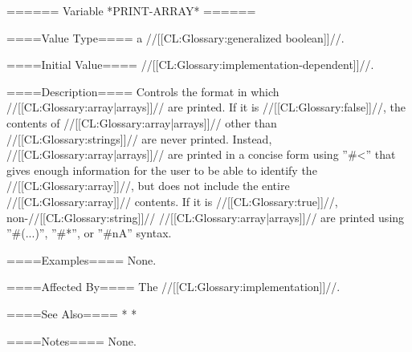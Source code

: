 ====== Variable *PRINT-ARRAY* ======

====Value Type====
a //[[CL:Glossary:generalized boolean]]//.

====Initial Value====
//[[CL:Glossary:implementation-dependent]]//.

====Description====
Controls the format in which //[[CL:Glossary:array|arrays]]// are printed. If it is //[[CL:Glossary:false]]//, the contents of //[[CL:Glossary:array|arrays]]// other than //[[CL:Glossary:strings]]// are never printed. Instead, //[[CL:Glossary:array|arrays]]// are printed in a concise form using ''#<'' that gives enough information for the user to be able to identify the //[[CL:Glossary:array]]//, but does not include the entire //[[CL:Glossary:array]]// contents. If it is //[[CL:Glossary:true]]//, non-//[[CL:Glossary:string]]// //[[CL:Glossary:array|arrays]]// are printed using ''#(...)'', ''#*'', or ''#nA'' syntax.

====Examples====
None.

====Affected By====
The //[[CL:Glossary:implementation]]//.

====See Also====
  * {\secref\SharpsignLeftParen}
  * {\secref\SharpsignLeftAngle}

====Notes====
None.

